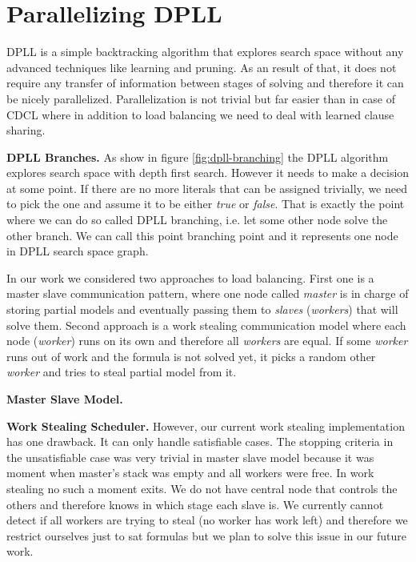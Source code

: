 \documentclass[letterpaper]{article}
\newcommand{\mypar}[1]{{\bf #1.}}
\begin{document}
\section{Parallelizing DPLL}\label{sec:parallel_dpll}

DPLL is a simple backtracking algorithm that explores search space without any advanced techniques like learning and pruning. As an result of that, it does not require any transfer of information between stages of solving and therefore it can be nicely parallelized. Parallelization is not trivial but far easier than in case of CDCL where in addition to load balancing we need to deal with learned clause sharing. 


\mypar{DPLL Branches}
As show in figure \ref{fig:dpll-branching} the DPLL algorithm explores search space with depth first search. However it needs to make a decision at some point. If there are no more literals that can be assigned trivially, we need to pick the one and assume it to be either \textit{true} or \textit{false}. That is exactly the point where we can do so called DPLL branching, i.e. let some other node solve the other branch. We can call this point branching point and it represents one node in DPLL search space graph. 

In our work we considered two approaches to load balancing. 
First one is a master slave communication pattern, where one node called \textit{master} is in charge of storing partial models and eventually passing them to \textit{slaves} (\textit{workers}) that will solve them.
Second approach is a work stealing communication model where each node (\textit{worker}) runs on its own and therefore all \textit{workers} are equal. If some \textit{worker} runs out of work and the formula is not solved yet, it picks a random other \textit{worker} and tries to steal partial model from it.

\mypar{Master Slave Model}

\mypar{Work Stealing Scheduler}
However, our current work stealing implementation has one drawback. It can only handle satisfiable cases. The stopping criteria in the unsatisfiable case was very trivial in master slave model because it was moment when master's stack was empty and all workers were free. In work stealing no such a moment exits. We do not have central node that controls the others and therefore knows in which stage each slave is. We currently cannot detect if all workers are trying to steal (no worker has work left) and therefore we restrict ourselves just to sat formulas but we plan to solve this issue in our future work. 
\end{document}

